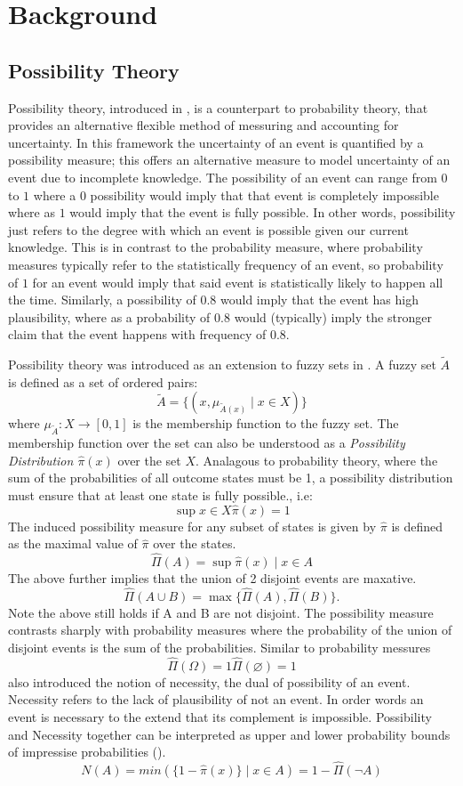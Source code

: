 \documentclass[12pt,a4paper]{report}
\begin{document}
\chapter{Background}
\section{Possibility Theory}

Possibility theory, introduced in \cite{ZADEH19999}, is a counterpart to probability theory, that provides an alternative flexible method of messuring and accounting for uncertainty.
In this framework the uncertainty of an event is quantified by a possibility measure; this offers an alternative measure to model uncertainty of an event due to incomplete knowledge.
The possibility of an event can range from $0$ to $1$ where a $0$ possibility would imply that that event is completely impossible where as $1$ would imply that the event is fully possible.
In other words, possibility just refers to the degree with which an event is possible given our current knowledge.
This is in contrast to the probability measure, where probability measures typically refer to the statistically frequency of an event, so probability of $1$ for an event would imply that said event is statistically likely to happen all the time.
Similarly, a possibility of $0.
8$ would imply that the event has high plausibility, where as a probability of $0.8$ would (typically) imply the stronger claim that the event happens with frequency of 0.8. \par

Possibility theory was introduced as an extension to fuzzy sets in \cite{ZADEH19999}. A fuzzy set $\tilde{A}$ is defined as a set of ordered pairs:
\[
  \tilde{A} = \{(x, \mu_{\tilde{A}(x)} \mid x \in X)\} 
\]
where $\mu_{\tilde{A}}: X \to [0,1]$ is the membership function to the fuzzy set. The membership function over the set can also be understood as a \emph{Possibility Distribution $\hat{\pi}(x)$} over the set $X$. Analagous to probability theory, where the sum of the probabilities of all outcome states must be 1, a possibility distribution must ensure that at least one state is fully possible., i.e:
\[
  \sup{x \in X} \hat{\pi}(x) = 1
\]
The induced possibility measure for any subset of states is given by $\hat{\pi}$ is defined as the maximal value of $\hat{\pi}$ over the states. 
\[ \hat{\Pi}(A) = \sup {\hat{\pi}(x) \mid x \in A} \]
The above further implies that the union of 2 disjoint events are maxative. 
\[
  \hat{\Pi}(A \cup B) = \max\{\hat{\Pi}(A),\hat{\Pi}(B)\}.
\]
Note the above still holds if A and B are not disjoint. The possibility measure contrasts sharply with probability measures where the probability of the union of disjoint events is the sum of the probabilities. Similar to probability messures 
\[
\hat{\Pi}(\Omega) = 1
\hat{\Pi}(\varnothing) = 1
\]
\cite{Dubois2001} also introduced the notion of necessity, the dual of possibility of an event. Necessity refers to the lack of plausibility of not an event. In order words an event is necessary to the extend that its complement is impossible. Possibility and Necessity together can be interpreted as upper and lower probability bounds of impressise probabilities (\cite{DUBOIS199265}). 
\[
  N(A) = min(\{1-\hat{\pi}(x)\} \mid x \in A) = 1 - \hat{\Pi}(\neg A)
\]
\end{document}
